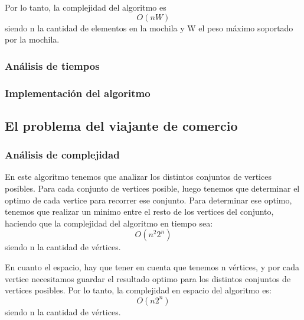 Por lo tanto, la complejidad del algoritmo es
$$ O(n W) $$ siendo n la cantidad de elementos en la mochila y W el peso máximo soportado por la mochila.

\subsubsection{Análisis de tiempos}
\newpage

\subsubsection{Implementación del algoritmo}
\newpage

\subsection{El problema del viajante de comercio}
\subsubsection{Análisis de complejidad}
En este algoritmo tenemos que analizar los distintos conjuntos de vertices posibles. Para cada conjunto de vertices posible, luego tenemos que determinar el optimo de cada vertice para recorrer ese conjunto.
Para determinar ese optimo, tenemos que realizar un minimo entre el resto de los vertices del conjunto, haciendo que la complejidad del algoritmo en tiempo sea:
$$O(n^2 2^n)$$
siendo n la cantidad de vértices.

En cuanto el espacio, hay que tener en cuenta que tenemos n vértices, y por cada vertice necesitamos guardar el resultado optimo para los distintos conjuntos de vertices posibles.
Por lo tanto, la complejidad en espacio del algoritmo es:
$$O(n 2^n)$$
siendo n la cantidad de vértices.


